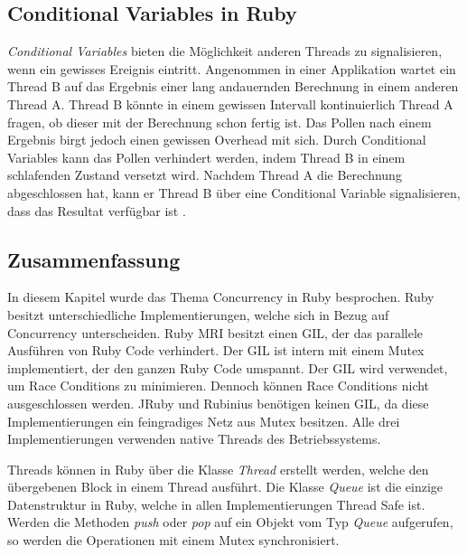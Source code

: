 \subsection{Conditional Variables in Ruby}

\emph{Conditional Variables} bieten die Möglichkeit anderen Threads zu signalisieren, wenn ein gewisses Ereignis eintritt. Angenommen in einer Applikation wartet ein Thread B auf das Ergebnis einer lang andauernden Berechnung in einem anderen Thread A. Thread B könnte in einem gewissen Intervall kontinuierlich Thread A fragen, ob dieser mit der Berechnung schon fertig ist. Das Pollen nach einem Ergebnis birgt jedoch einen gewissen Overhead mit sich. Durch Conditional Variables kann das Pollen verhindert werden, indem Thread B in einem schlafenden Zustand versetzt wird. Nachdem Thread A die Berechnung abgeschlossen hat, kann er Thread B über eine Conditional Variable signalisieren, dass das Resultat verfügbar ist \cite[p. 748]{tan09} \cite[p. 100]{Sto2013}. 

\subsection{Zusammenfassung}
In diesem Kapitel wurde das Thema Concurrency in Ruby besprochen. Ruby besitzt unterschiedliche Implementierungen, welche sich in Bezug auf Concurrency unterscheiden. Ruby MRI besitzt einen GIL, der das parallele Ausführen von Ruby Code verhindert. Der GIL ist intern mit einem Mutex implementiert, der den ganzen Ruby Code umspannt. Der GIL wird verwendet, um Race Conditions zu minimieren. Dennoch können Race Conditions nicht ausgeschlossen werden. JRuby und Rubinius benötigen keinen GIL, da diese Implementierungen ein feingradiges Netz aus Mutex besitzen. Alle drei Implementierungen verwenden native Threads des Betriebssystems. 

Threads können in Ruby über die Klasse \emph{Thread} erstellt werden, welche den übergebenen Block in einem Thread ausführt. Die Klasse \emph{Queue} ist die einzige Datenstruktur in Ruby, welche in allen Implementierungen Thread Safe ist. Werden die Methoden \emph{push} oder \emph{pop} auf ein Objekt vom Typ \emph{Queue} aufgerufen, so werden die Operationen mit einem Mutex synchronisiert.